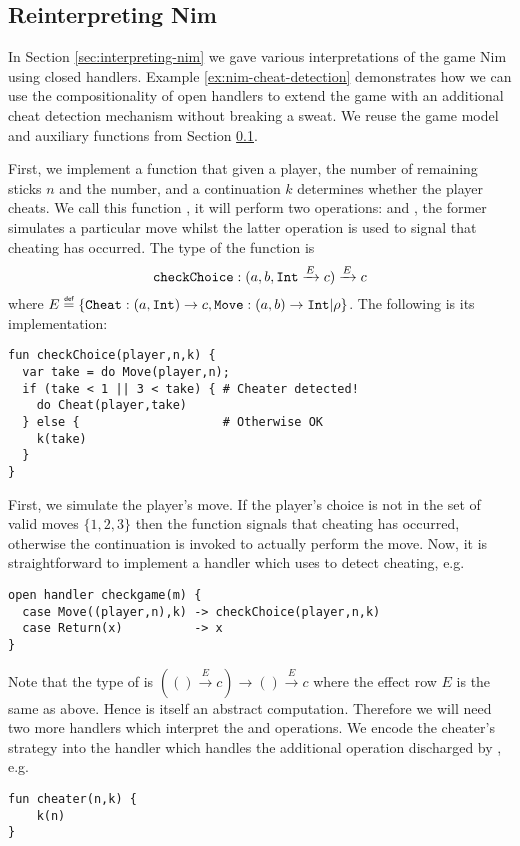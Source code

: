 \subsection{Reinterpreting Nim}\label{sec:reinterpreting-nim}
In Section \ref{sec:interpreting-nim} we gave various interpretations of the game Nim using closed handlers. Example \ref{ex:nim-cheat-detection} demonstrates how we can use the compositionality of open handlers to extend the game with an additional cheat detection mechanism without breaking a sweat. We reuse the game model and auxiliary functions from Section \ref{sec:reinterpreting-nim}.
\begin{example}\label{ex:nim-cheat-detection}
First, we implement a function that given a player, the number of remaining sticks $n$ and the number, and a continuation $k$ determines whether the player cheats. We call this function , it will perform two operations:  and , the former simulates a particular move whilst the latter operation is used to signal that cheating has occurred. The type of the function is
\[
\texttt{checkChoice} : (a, b, \texttt{Int} \xrightarrow{E} c) \xrightarrow{E} c
\] 
where $E \defas \{\type{Cheat}:(a, \type{Int}) \to c,\type{Move}:(a, b) \to \type{Int}|\rho\}$. The following is its implementation:
\begin{lstlisting}[style=links]
fun checkChoice(player,n,k) {
  var take = do Move(player,n);
  if (take < 1 || 3 < take) { # Cheater detected!
    do Cheat(player,take)
  } else {                    # Otherwise OK
    k(take)
  }
}
\end{lstlisting}
First, we simulate the player's move. If the player's choice is not in the set of valid moves $\{1,2,3\}$ then the function signals that cheating has occurred, otherwise the continuation  is invoked to actually perform the move. Now, it is straightforward to implement a handler which uses  to detect cheating, e.g.
\begin{lstlisting}[style=links]
open handler checkgame(m) {
  case Move((player,n),k) -> checkChoice(player,n,k)
  case Return(x)          -> x
}
\end{lstlisting}
Note that the type of  is $(() \xrightarrow{E} c) \to () \xrightarrow{E} c$ where the effect row $E$ is the same as above. Hence  is itself an abstract computation.
Therefore we will need two more handlers which interpret the  and  operations. We encode the cheater's strategy into the handler which handles the additional  operation discharged by , e.g.
\begin{lstlisting}[style=links]
fun cheater(n,k) {
    k(n)
}


\end{lstlisting}
\end{example}
